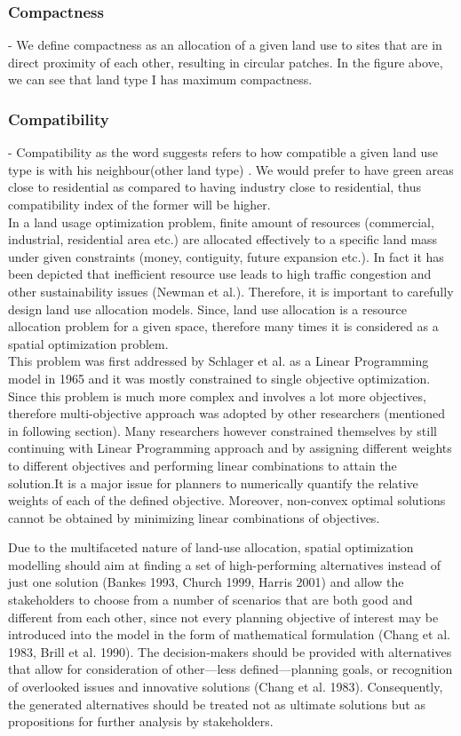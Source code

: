 \documentclass[12pt]{article} %
\begin{document}
\subsubsection*{Compactness} - We define compactness as an allocation of a given land use to sites that are in direct proximity of each other, resulting in circular patches. In the figure above, we can see that land type I has maximum compactness.

\subsubsection*{Compatibility} - Compatibility  as the word suggests refers to how compatible a given land use type is with his neighbour(other land type) . We would prefer to have green areas close to residential as compared to having industry close to residential, thus compatibility index of the former will be higher.\\[.25cm]

In a land usage optimization problem, finite amount of resources (commercial, industrial, residential area etc.) are allocated effectively to a specific land mass under given constraints (money, contiguity, future expansion etc.). In fact it has been depicted that inefficient resource use leads to high traffic congestion and other sustainability issues (Newman et al.). Therefore, it is important to carefully design land use allocation models. Since, land use allocation is a resource allocation problem for a given space, therefore many times it is considered as a spatial optimization problem. \\
This problem was first addressed by Schlager et al. as a Linear Programming model in 1965 and it was mostly constrained to single objective optimization. Since this problem is much more complex and involves a lot more objectives, therefore multi-objective approach was adopted by other researchers (mentioned in following section).  Many researchers however constrained themselves by still continuing with Linear Programming approach and by assigning different weights to different objectives and performing linear combinations to attain the solution.It is a major issue for planners to numerically quantify the relative weights of each of the defined objective. Moreover, non-convex optimal solutions cannot be obtained by minimizing linear combinations of objectives.


Due to the multifaceted nature of land-use allocation, spatial optimization modelling should aim at finding a set of high-performing alternatives instead of just one solution (Bankes 1993, Church 1999, Harris 2001) and allow the stakeholders to choose from a number of scenarios that are both good and different from each other, since not every planning objective of interest may be introduced into the
model in the form of mathematical formulation (Chang et al. 1983, Brill et al. 1990). The decision-makers should be provided with alternatives that allow for consideration of other—less defined—planning goals, or recognition of overlooked issues and innovative solutions (Chang et al. 1983). Consequently, the generated alternatives should be treated not as ultimate solutions but as propositions for further analysis by stakeholders.
\end{document}
